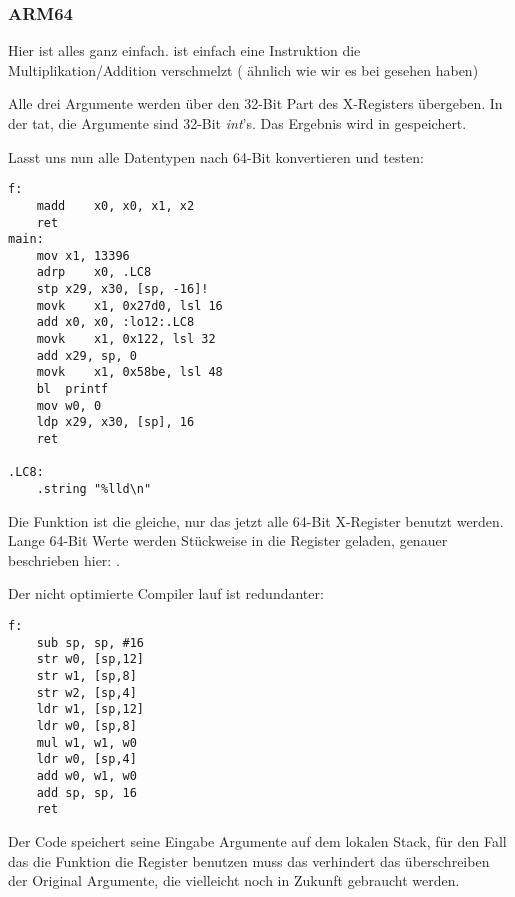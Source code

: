 \subsubsection{ARM64}



Hier ist alles ganz einfach. 
 ist einfach eine Instruktion die Multiplikation/Addition verschmelzt ( ähnlich wie wir es bei 
gesehen haben)

Alle drei Argumente werden über den 32-Bit Part des X-Registers übergeben.
In der tat, die Argumente sind 32-Bit \emph{int}'s.
Das Ergebnis wird in  gespeichert.



Lasst uns nun alle Datentypen nach 64-Bit  konvertieren und testen:



\begin{lstlisting}[style=customasmARM]
f:
	madd	x0, x0, x1, x2
	ret
main:
	mov	x1, 13396
	adrp	x0, .LC8
	stp	x29, x30, [sp, -16]!
	movk	x1, 0x27d0, lsl 16
	add	x0, x0, :lo12:.LC8
	movk	x1, 0x122, lsl 32
	add	x29, sp, 0
	movk	x1, 0x58be, lsl 48
	bl	printf
	mov	w0, 0
	ldp	x29, x30, [sp], 16
	ret

.LC8:
	.string	"%lld\n"
\end{lstlisting}

Die \ttf{} Funktion ist die gleiche, nur das jetzt alle 64-Bit X-Register benutzt werden.
Lange 64-Bit Werte werden Stückweise in die Register geladen, genauer beschrieben hier: .


Der nicht optimierte Compiler lauf ist redundanter:

\begin{lstlisting}[style=customasmARM]
f:
	sub	sp, sp, #16
	str	w0, [sp,12]
	str	w1, [sp,8]
	str	w2, [sp,4]
	ldr	w1, [sp,12]
	ldr	w0, [sp,8]
	mul	w1, w1, w0
	ldr	w0, [sp,4]
	add	w0, w1, w0
	add	sp, sp, 16
	ret
\end{lstlisting}

Der Code speichert seine Eingabe Argumente auf dem lokalen Stack,
für den Fall das die Funktion die  Register benutzen muss
das verhindert das überschreiben der Original Argumente, die vielleicht
noch in Zukunft gebraucht werden.

